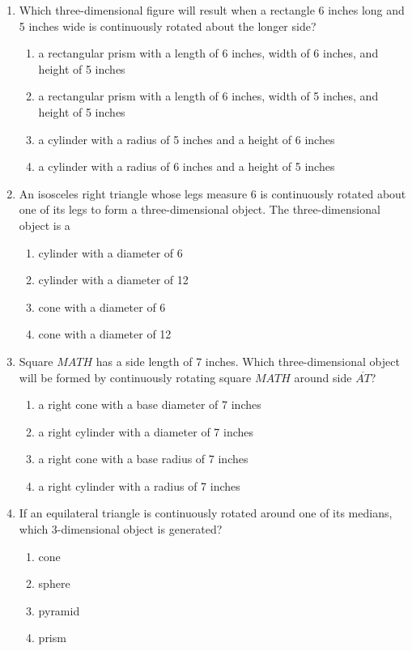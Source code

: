 \documentclass[12pt, twoside]{article}
\begin{document}
\begin{enumerate}
  \item %
  Which three-dimensional figure will result when a rectangle 6 inches long and 5 inches wide is continuously rotated about the longer side?
    \begin{enumerate}
      \item a rectangular prism with a length of 6 inches, width of 6 inches, and height of 5 inches
      \item a rectangular prism with a length of 6 inches, width of 5 inches, and height of 5 inches
      \item a cylinder with a radius of 5 inches and a height of 6 inches
      \item a cylinder with a radius of 6 inches and a height of 5 inches
    \end{enumerate}

  \item %
  An isosceles right triangle whose legs measure 6 is continuously rotated about one of its legs to form a three-dimensional object. The three-dimensional object is a
    \begin{enumerate}
      \item cylinder with a diameter of 6
      \item cylinder with a diameter of 12
      \item cone with a diameter of 6
      \item cone with a diameter of 12
    \end{enumerate}

  \item %
  Square $MATH$ has a side length of 7 inches. Which three-dimensional object will be formed by continuously rotating square $MATH$ around side $\overline{AT}$?
    \begin{enumerate}
      \item a right cone with a base diameter of 7 inches
      \item a right cylinder with a diameter of 7 inches
      \item a right cone with a base radius of 7 inches
      \item a right cylinder with a radius of 7 inches
    \end{enumerate}

  \item If an equilateral triangle is continuously rotated around one of its medians, which 3-dimensional object is generated?
    \begin{enumerate}
      \item cone
      \item sphere
      \item pyramid
      \item prism
    \end{enumerate}


\end{enumerate}
\end{document}
